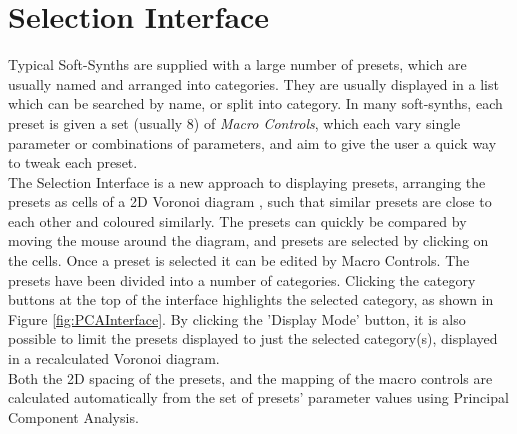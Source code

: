 \documentclass[11pt, oneside]{report}   	%
\begin{document}
\section{Selection Interface}
Typical Soft-Synths are supplied with a large number of presets, which are usually named and arranged into categories. They are usually displayed in a list which can be searched by name, or split into category. In many soft-synths, each preset is given a set (usually 8) of \emph{Macro Controls}, which each vary single parameter or combinations of parameters, and aim to give the user a quick way to tweak each preset.\\
The Selection Interface is a new approach to displaying presets, arranging the presets as cells of a 2D Voronoi diagram \cite{Voronoi}, such that similar presets are close to each other and coloured similarly. The presets can quickly be compared by moving the mouse around the diagram, and presets are selected by clicking on the cells. Once a preset is selected it can be edited by Macro Controls. 
The presets have been divided into a number of categories. Clicking the category buttons at the top of the interface highlights the selected category, as shown in Figure \ref{fig:PCAInterface}. By clicking the 'Display Mode' button, it is also possible to limit the presets displayed to just the selected category(s), displayed in a recalculated Voronoi diagram.\\
Both the 2D spacing of the presets, and the mapping of the macro controls are calculated automatically from the set of presets' parameter values using Principal Component Analysis.
\end{document}
